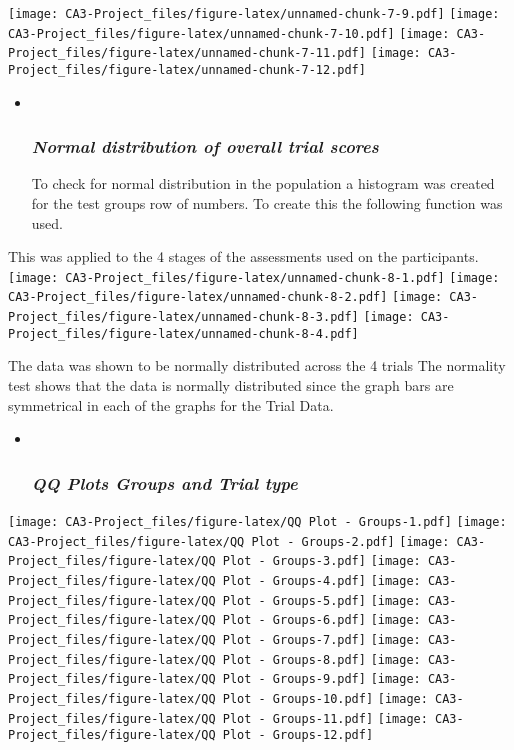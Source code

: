 \documentclass[
]{article}
\begin{document}
\texttt{[image: CA3-Project\_files/figure-latex/unnamed-chunk-7-9.pdf]}
\texttt{[image: CA3-Project\_files/figure-latex/unnamed-chunk-7-10.pdf]}
\texttt{[image: CA3-Project\_files/figure-latex/unnamed-chunk-7-11.pdf]}
\texttt{[image: CA3-Project\_files/figure-latex/unnamed-chunk-7-12.pdf]}

\begin{itemize}
\item ~
  \hypertarget{normal-distribution-of-overall-trial-scores}{%
  \subsubsection{\texorpdfstring{\emph{Normal distribution of overall
  trial
  scores}}{Normal distribution of overall trial scores}}\label{normal-distribution-of-overall-trial-scores}}

  To check for normal distribution in the population a histogram was
  created for the test groups row of numbers. To create this the
  following function was used.
\end{itemize}

This was applied to the 4 stages of the assessments used on the
participants.
\texttt{[image: CA3-Project\_files/figure-latex/unnamed-chunk-8-1.pdf]}
\texttt{[image: CA3-Project\_files/figure-latex/unnamed-chunk-8-2.pdf]}
\texttt{[image: CA3-Project\_files/figure-latex/unnamed-chunk-8-3.pdf]}
\texttt{[image: CA3-Project\_files/figure-latex/unnamed-chunk-8-4.pdf]}

The data was shown to be normally distributed across the 4 trials The
normality test shows that the data is normally distributed since the
graph bars are symmetrical in each of the graphs for the Trial Data.

\begin{itemize}
\item ~
  \hypertarget{qq-plots-groups-and-trial-type}{%
  \subsubsection{\texorpdfstring{\emph{QQ Plots Groups and Trial
  type}}{QQ Plots Groups and Trial type}}\label{qq-plots-groups-and-trial-type}}
\end{itemize}

\texttt{[image: CA3-Project\_files/figure-latex/QQ Plot - Groups-1.pdf]}
\texttt{[image: CA3-Project\_files/figure-latex/QQ Plot - Groups-2.pdf]}
\texttt{[image: CA3-Project\_files/figure-latex/QQ Plot - Groups-3.pdf]}
\texttt{[image: CA3-Project\_files/figure-latex/QQ Plot - Groups-4.pdf]}
\texttt{[image: CA3-Project\_files/figure-latex/QQ Plot - Groups-5.pdf]}
\texttt{[image: CA3-Project\_files/figure-latex/QQ Plot - Groups-6.pdf]}
\texttt{[image: CA3-Project\_files/figure-latex/QQ Plot - Groups-7.pdf]}
\texttt{[image: CA3-Project\_files/figure-latex/QQ Plot - Groups-8.pdf]}
\texttt{[image: CA3-Project\_files/figure-latex/QQ Plot - Groups-9.pdf]}
\texttt{[image: CA3-Project\_files/figure-latex/QQ Plot - Groups-10.pdf]}
\texttt{[image: CA3-Project\_files/figure-latex/QQ Plot - Groups-11.pdf]}
\texttt{[image: CA3-Project\_files/figure-latex/QQ Plot - Groups-12.pdf]}
\end{document}
